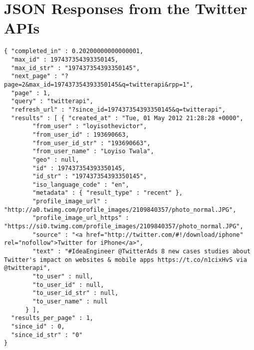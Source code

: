 \chapter{JSON Responses from the Twitter APIs}
\label{app:json}
\python
\begin{lstlisting}[caption=An example Twitter Search API response, label=lst:searchapi]
{ "completed_in" : 0.20200000000000001,
  "max_id" : 197437354393350145,
  "max_id_str" : "197437354393350145",
  "next_page" : "?page=2&max_id=197437354393350145&q=twitterapi&rpp=1",
  "page" : 1,
  "query" : "twitterapi",
  "refresh_url" : "?since_id=197437354393350145&q=twitterapi",
  "results" : [ { "created_at" : "Tue, 01 May 2012 21:28:28 +0000",
        "from_user" : "loyisothevictor",
        "from_user_id" : 193690663,
        "from_user_id_str" : "193690663",
        "from_user_name" : "Loyiso Twala",
        "geo" : null,
        "id" : 197437354393350145,
        "id_str" : "197437354393350145",
        "iso_language_code" : "en",
        "metadata" : { "result_type" : "recent" },
        "profile_image_url" : "http://a0.twimg.com/profile_images/2109840357/photo_normal.JPG",
        "profile_image_url_https" : "https://si0.twimg.com/profile_images/2109840357/photo_normal.JPG",
        "source" : "<a href="http://twitter.com/#!/download/iphone" rel="nofollow">Twitter for iPhone</a>",
        "text" : "#IdeaEngineer @TwitterAds 8 new cases studies about Twitter's impact on websites & mobile apps https://t.co/n1cixHvS via @twitterapi",
        "to_user" : null,
        "to_user_id" : null,
        "to_user_id_str" : null,
        "to_user_name" : null
      } ],
  "results_per_page" : 1,
  "since_id" : 0,
  "since_id_str" : "0"
}
\end{lstlisting}
\newpage
